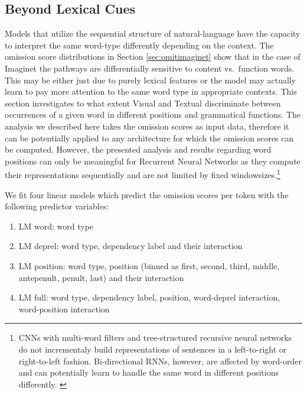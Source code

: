 

\subsection{Beyond Lexical Cues}
\label{sec:beyondlexical}

Models that utilize the sequential structure of natural-language 
have the capacity to interpret the same word-type differently depending on
the context. The omission score distributions in Section \ref{sec:omitimaginet} 
show that in the case of {\sc Imaginet} the 
pathways are differentially sensitive to content vs.\ function
words. This may be either just due to purely lexical features or the model 
may actually learn to pay more attention to the same word type in appropriate
contexts. This section investigates to what extent {\sc Visual} and {\sc Textual}
discriminate between occurrences of a given word in different positions and 
grammatical functions. The analysis we described here takes \label{edit:beyonlexicalgeneral}
the omission scores as input data, therefore it can be potentially applied 
to any architecture for which the omission scores can be computed. However,
the presented analysis and results regarding word positions can only be meaningful
for Recurrent Neural Networks as they compute their representations sequentially and are not
limited by fixed windowsizes.\footnote{CNNs with multi-word filters
and tree-structured recursive neural networks do not incrementaly build representations
of sentences in a left-to-right or right-to-left fashion. 
Bi-directional RNNs, however, are affected by word-order and can potentially
learn to handle the same word in different positions differently. \label{edit:foot}}

We fit four linear models which predict the omission 
scores per token with the following predictor variables: 


\begin{enumerate}
	\item {\sc LM word}: word type
	\item {\sc LM deprel}: word type, dependency label and their interaction 
	\item {\sc LM position}: word type, position (binned as first, second, third, middle,
	antepenult, penult, last) and their interaction
	\item {\sc LM full}: word type, dependency label, position, word-deprel interaction, 
	word-position interaction
\end{enumerate}


